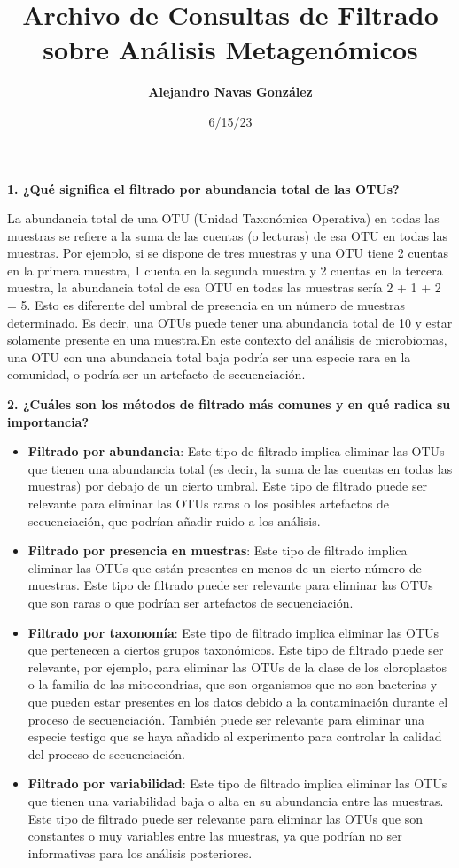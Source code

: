\documentclass[
  letterpaper,
  DIV=11,
  numbers=noendperiod]{scrartcl}
\title{\textbf{Archivo de Consultas de Filtrado sobre Análisis
Metagenómicos}}
\author{\textbf{Alejandro Navas González}}
\date{6/15/23}
\begin{document}
\maketitle
\textbf{1. ¿Qué significa el filtrado por abundancia total de las OTUs?}

La abundancia total de una OTU (Unidad Taxonómica Operativa) en todas
las muestras se refiere a la suma de las cuentas (o lecturas) de esa OTU
en todas las muestras. Por ejemplo, si se dispone de tres muestras y una
OTU tiene 2 cuentas en la primera muestra, 1 cuenta en la segunda
muestra y 2 cuentas en la tercera muestra, la abundancia total de esa
OTU en todas las muestras sería 2 + 1 + 2 = 5. Esto es diferente del
umbral de presencia en un número de muestras determinado. Es decir, una
OTUs puede tener una abundancia total de 10 y estar solamente presente
en una muestra.En este contexto del análisis de microbiomas, una OTU con
una abundancia total baja podría ser una especie rara en la comunidad, o
podría ser un artefacto de secuenciación.

\textbf{2. ¿Cuáles son los métodos de filtrado más comunes y en qué
radica su importancia?}

\begin{itemize}
\item
  \textbf{Filtrado por abundancia}: Este tipo de filtrado implica
  eliminar las OTUs que tienen una abundancia total (es decir, la suma
  de las cuentas en todas las muestras) por debajo de un cierto umbral.
  Este tipo de filtrado puede ser relevante para eliminar las OTUs raras
  o los posibles artefactos de secuenciación, que podrían añadir ruido a
  los análisis.
\item
  \textbf{Filtrado por presencia en muestras}: Este tipo de filtrado
  implica eliminar las OTUs que están presentes en menos de un cierto
  número de muestras. Este tipo de filtrado puede ser relevante para
  eliminar las OTUs que son raras o que podrían ser artefactos de
  secuenciación.
\item
  \textbf{Filtrado por taxonomía}: Este tipo de filtrado implica
  eliminar las OTUs que pertenecen a ciertos grupos taxonómicos. Este
  tipo de filtrado puede ser relevante, por ejemplo, para eliminar las
  OTUs de la clase de los cloroplastos o la familia de las mitocondrias,
  que son organismos que no son bacterias y que pueden estar presentes
  en los datos debido a la contaminación durante el proceso de
  secuenciación. También puede ser relevante para eliminar una especie
  testigo que se haya añadido al experimento para controlar la calidad
  del proceso de secuenciación.
\item
  \textbf{Filtrado por variabilidad}: Este tipo de filtrado implica
  eliminar las OTUs que tienen una variabilidad baja o alta en su
  abundancia entre las muestras. Este tipo de filtrado puede ser
  relevante para eliminar las OTUs que son constantes o muy variables
  entre las muestras, ya que podrían no ser informativas para los
  análisis posteriores.
\end{itemize}
\end{document}
